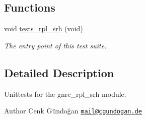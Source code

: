 \subsection*{Functions}
\begin{DoxyCompactItemize}
\item 
void \hyperlink{group__unittests_ga48f41dab63963836bd0a692d9137d0a8}{tests\+\_\+rpl\+\_\+srh} (void)
\begin{DoxyCompactList}\small\item\em The entry point of this test suite. \end{DoxyCompactList}\end{DoxyCompactItemize}


\subsection{Detailed Description}
Unittests for the {\ttfamily gnrc\+\_\+rpl\+\_\+srh} module. 

\begin{DoxyAuthor}{Author}
Cenk Gündoğan \href{mailto:mail@cgundogan.de}{\tt mail@cgundogan.\+de} 
\end{DoxyAuthor}
